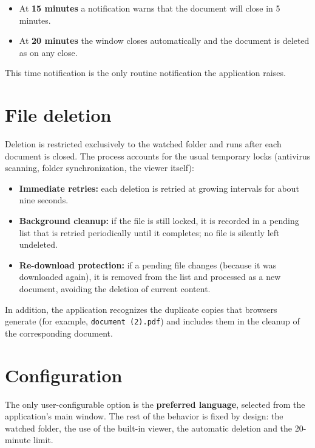 \documentclass[11pt,a4paper]{article}
\begin{document}
\begin{itemize}[leftmargin=1.4em,itemsep=2pt]
  \item At \textbf{15 minutes} a notification warns that the document will close in
        5 minutes.
  \item At \textbf{20 minutes} the window closes automatically and the document is
        deleted as on any close.
\end{itemize}

This time notification is the only routine notification the application raises.

\section{File deletion}
Deletion is restricted exclusively to the watched folder and runs after each
document is closed. The process accounts for the usual temporary locks (antivirus
scanning, folder synchronization, the viewer itself):

\begin{itemize}[leftmargin=1.4em,itemsep=2pt]
  \item \textbf{Immediate retries:} each deletion is retried at growing intervals
        for about nine seconds.
  \item \textbf{Background cleanup:} if the file is still locked, it is recorded in
        a pending list that is retried periodically until it completes; no file is
        silently left undeleted.
  \item \textbf{Re-download protection:} if a pending file changes (because it was
        downloaded again), it is removed from the list and processed as a new
        document, avoiding the deletion of current content.
\end{itemize}

In addition, the application recognizes the duplicate copies that browsers
generate (for example, \texttt{document (2).pdf}) and includes them in the cleanup
of the corresponding document.

\section{Configuration}
The only user-configurable option is the \textbf{preferred language}, selected
from the application's main window. The rest of the behavior is fixed by design:
the watched folder, the use of the built-in viewer, the automatic deletion and the
20-minute limit.
\end{document}
